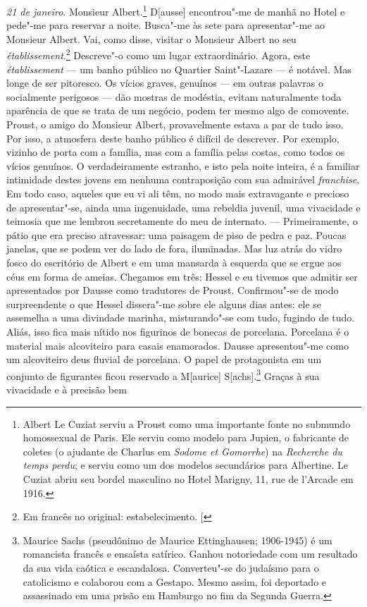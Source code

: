 \emph{21 de janeiro}. Monsieur Albert.\footnote{Albert Le Cuziat
  serviu a Proust como uma importante fonte no submundo homossexual de
  Paris. Ele serviu como modelo para Jupien, o fabricante de coletes (o
  ajudante de Charlus em \emph{Sodome et Gomorrhe}) na \emph{Recherche du
  temps perdu}; e serviu como um dos modelos secundários para Albertine. Le Cuziat abriu seu bordel
  masculino no Hotel Marigny, 11, rue de l'Arcade em 1916. \versal{[N. E.]}}
D{[}ausse{]} encontrou"-me de manhã no Hotel e pede"-me para reservar a
noite. Busca"-me às sete para apresentar"-me ao Monsieur Albert. Vai, como
disse, visitar o Monsieur Albert no seu \emph{établissement}.\footnote{Em francês no original: estabelecimento. {[}\versal{N. T.}{]}} Descreve"-o
como um lugar extraordinário. Agora, este \emph{établissement} --- um
banho público no Quartier Saint"-Lazare --- é notável. Mas longe de ser
pitoresco. Os vícios graves, genuínos --- em outras palavras o
socialmente perigosos --- dão mostras de modéstia, evitam naturalmente
toda aparência de que se trata de um negócio, podem ter mesmo algo de
comovente. Proust, o amigo do Monsieur Albert, provavelmente estava a
par de tudo isso. Por isso, a atmosfera deste banho público é difícil de
descrever. Por exemplo, vizinho de porta com a família, mas com a
família pelas costas, como todos os vícios genuínos. O verdadeiramente
estranho, e isto pela noite inteira, é a familiar intimidade destes
jovens em nenhuma contraposição com sua admirável \emph{franchise}. Em
todo caso, aqueles que eu vi ali têm, no modo mais extravagante e
precioso de apresentar"-se, ainda uma ingenuidade, uma rebeldia juvenil,
uma vivacidade e teimosia que me lembrou secretamente do meu de
internato. --- Primeiramente, o pátio que era preciso atravessar: uma
paisagem de piso de pedra e paz. Poucas janelas, que se podem ver do lado de
fora, iluminadas. Mas luz atrás do vidro fosco do escritório de Albert e
em uma mansarda à esquerda que se ergue aos céus em forma de ameias. Chegamos
em três: Hessel e eu tivemos que admitir ser apresentados por Dausse como
tradutores de Proust. Confirmou"-se de modo surpreendente o que Hessel
dissera"-me sobre ele alguns dias antes: ele se assemelha a uma divindade
marinha, misturando"-se com tudo, fugindo de tudo. Aliás, isso fica mais
nítido nos figurinos de bonecas de porcelana. Porcelana é o material
mais alcoviteiro para casais enamorados. Dausse apresentou"-me como um
alcoviteiro deus fluvial de porcelana. O papel de protagonista em um
conjunto de figurantes ficou reservado a M{[}aurice{]}
S{[}achs{]}.\footnote{Maurice Sachs (pseudônimo de Maurice
  Ettinghausen; 1906-1945) é um romancista francês e ensaísta satírico.
  Ganhou notoriedade com um resultado da sua vida caótica e escandalosa.
  Converteu"-se do judaísmo para o catolicismo e colaborou com a Gestapo.
  Mesmo assim, foi deportado e assassinado em uma prisão em Hamburgo no
  fim da Segunda Guerra. \versal{[N. E.]}} Graças à sua vivacidade e à precisão bem
